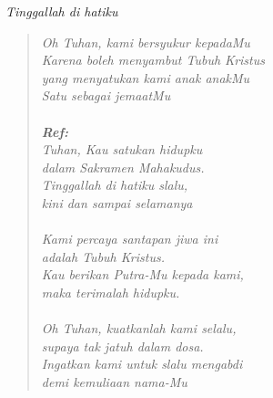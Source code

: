 \begin{center}
\itshape{Tinggallah di hatiku}
\end{center}

\small
\begin{verse}
\itshape{
Oh Tuhan, kami bersyukur kepadaMu\\
Karena boleh menyambut Tubuh Kristus\\
yang  menyatukan kami anak anakMu\\
Satu sebagai jemaatMu\\
{~}\\
\textbf{Ref:}\\
Tuhan, Kau satukan hidupku\\ 
dalam Sakramen Mahakudus.\\
Tinggallah di hatiku slalu,\\
kini dan sampai selamanya\\
{~}\\
Kami percaya santapan jiwa ini\\ 
adalah Tubuh Kristus.\\
Kau berikan Putra-Mu kepada kami,\\
maka terimalah hidupku.\\
{~}\\
Oh Tuhan, kuatkanlah kami selalu,\\
supaya tak jatuh dalam dosa.\\
Ingatkan kami untuk slalu mengabdi\\
demi kemuliaan nama-Mu
}
\end{verse}
\normalsize